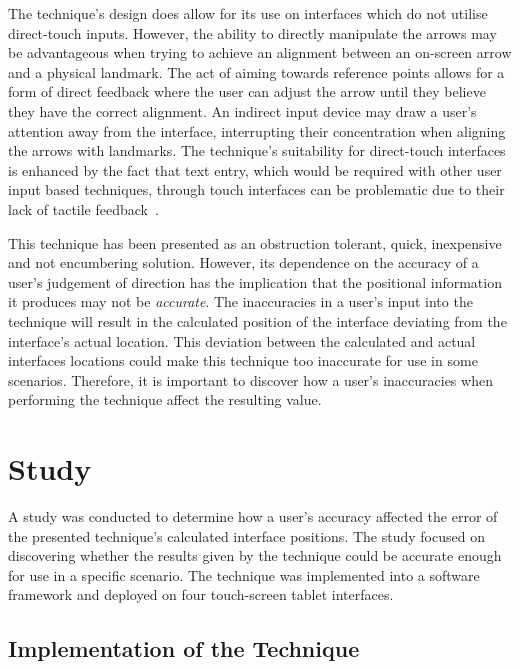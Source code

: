 \documentclass{bmcart}
\begin{document}
The technique's design does allow for its use on interfaces which do not utilise direct-touch inputs.
However, the ability to directly manipulate the arrows may be advantageous when trying to achieve an alignment between an on-screen arrow and a physical landmark. 
The act of aiming towards reference points allows for a form of direct feedback where the user can adjust the arrow until they believe they have the correct alignment.  
An indirect input device may draw a user's attention away from the interface, interrupting their concentration when aligning the arrows with landmarks.
The technique's suitability for direct-touch interfaces is enhanced by the fact that text entry, which would be required with other user input based techniques, through touch interfaces can be problematic due to their lack of tactile feedback~\cite{Weiss2009}.

This technique has been presented as an obstruction tolerant, quick, inexpensive and not encumbering solution.
However, its dependence on the accuracy of a user's judgement of direction has the implication that the positional information it produces may not be {\emph{accurate}}.
The inaccuracies in a user's input into the technique will result in the calculated position of the interface deviating from the interface's actual location.
This deviation between the calculated and actual interfaces locations could make this technique too inaccurate for use in some scenarios.
Therefore, it is important to discover how a user's inaccuracies when performing the technique affect the resulting value.

\section*{Study}\label{sec:study}


A study was conducted to determine how a user's accuracy affected the error of the presented technique's calculated interface positions.
The study focused on discovering whether the results given by the technique could be accurate enough for use in a specific scenario.
The technique was implemented into a software framework and deployed on four touch-screen tablet interfaces.

\subsection*{Implementation of the Technique}\label{sec:implementation}
\end{document}
